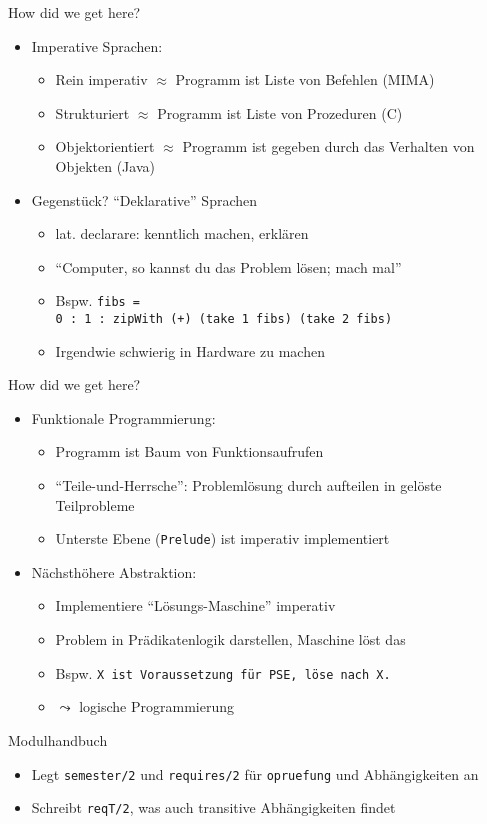 \documentclass{beamer}
\newcommand{\code}[1]{
	\begin{mdframed}
		
	\end{mdframed}
}
\begin{document}
\begin{frame}{How did we get here?}
	\begin{itemize}
		\item Imperative Sprachen:
		\begin{itemize}
			\item Rein imperativ $\approx$ Programm ist Liste von Befehlen (MIMA)
			\item Strukturiert $\approx$ Programm ist Liste von Prozeduren (C)
			\item Objektorientiert $\approx$ Programm ist gegeben durch das Verhalten von Objekten (Java)
		\end{itemize}
		\item Gegenstück? \pause \enquote{Deklarative} Sprachen
		\begin{itemize}
			\item lat. declarare: kenntlich machen, erklären
			\item \enquote{Computer, so kannst du das Problem lösen; mach mal}
			\item Bspw. \texttt{fibs =\\0 : 1 : zipWith (+) (take 1 fibs) (take 2 fibs)}
			\pause
			\item Irgendwie schwierig in Hardware zu machen
		\end{itemize}
	\end{itemize}
\end{frame}

\begin{frame}{How did we get here?}
	\begin{itemize}
		\item Funktionale Programmierung:
		\begin{itemize}
			\item Programm ist Baum von Funktionsaufrufen
			\item \enquote{Teile-und-Herrsche}: Problemlösung durch aufteilen in gelöste Teilprobleme
			\item Unterste Ebene (\texttt{Prelude}) ist imperativ implementiert
		\end{itemize}
		\pause
		\item Nächsthöhere Abstraktion:
		\begin{itemize}
			\item Implementiere \enquote{Lösungs-Maschine} imperativ
			\item Problem in Prädikatenlogik darstellen, Maschine löst das
			\item Bspw. \texttt{X ist Voraussetzung für PSE, löse nach X.}
			\item $\leadsto$ logische Programmierung
		\end{itemize}
	\end{itemize}
\end{frame}

\begin{frame}{Modulhandbuch}
	\code{demos/modulhandbuch.pl}

	\begin{itemize}
		\item Legt \texttt{semester/2} und \texttt{requires/2} für \texttt{opruefung} und Abhängigkeiten an
		\item Schreibt \texttt{reqT/2}, was auch transitive Abhängigkeiten findet
	\end{itemize}
\end{frame}
\end{document}
